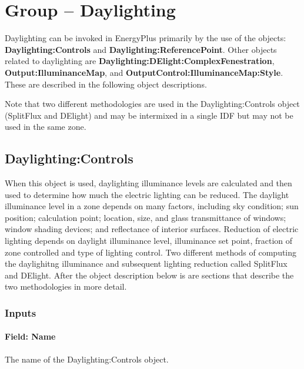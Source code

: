 \section{Group -- Daylighting}\label{group-daylighting}

Daylighting can be invoked in EnergyPlus primarily by the use of the objects: \textbf{Daylighting:Controls} and \textbf{Daylighting:ReferencePoint}. Other objects related to daylighting are \textbf{Daylighting:DElight:ComplexFenestration}, \textbf{Output:IlluminanceMap}, and \textbf{OutputControl:IlluminanceMap:Style}.  These are described in the following object descriptions.

\begin{callout}
  Note that two different methodologies are used in the Daylighting:Controls object (SplitFlux and DElight) and may be intermixed in a single IDF but may not be used in the same zone.
\end{callout}

\subsection{Daylighting:Controls}\label{daylightingcontrols-000}

When this object is used, daylighting illuminance levels are calculated and then used to determine how much the electric lighting can be reduced. The daylight illuminance level in a zone depends on many factors, including sky condition; sun position; calculation point; location, size, and glass transmittance of windows; window shading devices; and reflectance of interior surfaces. Reduction of electric lighting depends on daylight illuminance level, illuminance set point, fraction of zone controlled and type of lighting control. Two different methods of computing the daylighitng illuminance and subsequent lighting reduction called SplitFlux and DElight. After the object description below is are sections that describe the two methodologies in more detail. 

\subsubsection{Inputs}\label{inputs-009}

\paragraph{Field: Name}\label{field-name-001}

The name of the Daylighting:Controls object.

